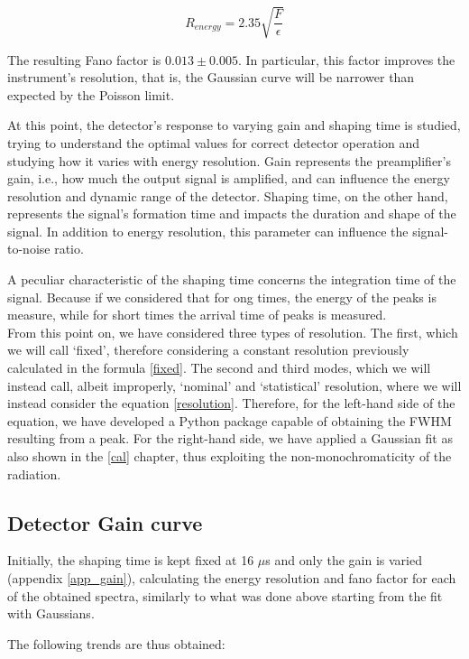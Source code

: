 \documentclass[a4paper,twoside,openany]{book}
\begin{document}
\begin{equation}
R_{energy} = 2.35\sqrt{\frac{F}{\epsilon}}
\end{equation}

The resulting Fano factor is $0.013\pm0.005$. In particular, this factor improves the instrument's resolution, that is, the Gaussian curve will be narrower than expected by the Poisson limit.

At this point, the detector's response to varying gain and shaping time is studied, trying to understand the optimal values for correct detector operation and studying how it varies with energy resolution. Gain represents the preamplifier's gain, i.e., how much the output signal is amplified, and can influence the energy resolution and dynamic range of the detector. Shaping time, on the other hand, represents the signal's formation time and impacts the duration and shape of the signal. In addition to energy resolution, this parameter can influence the signal-to-noise ratio.

A peculiar characteristic of the shaping time concerns the integration time of the signal. Because if we considered that for ong times, the energy of the peaks is measure, while for short times the arrival time of peaks is measured.\\

From this point on, we have considered three types of resolution. The first, which we will call `fixed', therefore considering a constant resolution previously calculated in the formula \ref{fixed}. The second and third modes, which we will instead call, albeit improperly, `nominal' and `statistical' resolution, where we will instead consider the equation \ref{resolution}. Therefore, for the left-hand side of the equation, we have developed a Python package capable of obtaining the FWHM resulting from a peak. For the right-hand side, we have applied a Gaussian fit as also shown in the \ref{cal} chapter, thus exploiting the non-monochromaticity of the radiation.

	\subsection{Detector Gain curve}
Initially, the shaping time is kept fixed at 16 $\mu$s and only the gain is varied (appendix \ref{app_gain}), calculating the energy resolution and fano factor for each of the obtained spectra, similarly to what was done above starting from the fit with Gaussians. 

The following trends are thus obtained:
\end{document}

